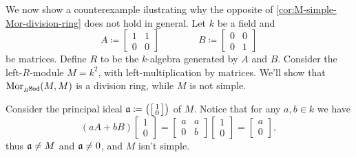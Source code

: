 \begin{example}
\label{exp:counterexp-schur-opposite}
We now show a counterexample ilustrating why the opposite of
\cref{cor:M-simple-Mor-division-ring} does not hold in general. Let \(k\) be a
field and
\[
A \coloneq
\begin{bmatrix}
  1 & 1 \\
  0 & 0
\end{bmatrix}
\qquad \qquad
B \coloneq
\begin{bmatrix}
  0 & 0 \\
  0 & 1
\end{bmatrix}
\]
be matrices. Define \(R\) to be the \(k\)-algebra generated by \(A\) and
\(B\). Consider the left-\(R\)-module \(M = k^2\), with left-multiplication by
matrices. We'll show that \(\operatorname{Mor}_{{{}_{R}\texttt{Mod}}}(M, M)\) is a division ring, while
\(M\) is not simple.

Consider the principal ideal
\(
\mathfrak{a} \coloneq \big(\big[
\begin{smallmatrix}
  1 \\
  0
\end{smallmatrix}
\big]\big)\) of \(M\). Notice that for any \(a, b \in k\) we have
\[
(a A + b B)
\begin{bmatrix}
  1 \\
  0
\end{bmatrix}
=
\begin{bmatrix}
  a & a \\
  0 & b
\end{bmatrix}
\begin{bmatrix}
  1 \\
  0
\end{bmatrix}
=
\begin{bmatrix}
  a \\
  0
\end{bmatrix},
\]
thus \(\mathfrak{a} \neq M\) and \(\mathfrak{a} \neq 0\), and \(M\) isn't
simple.


\end{example}
